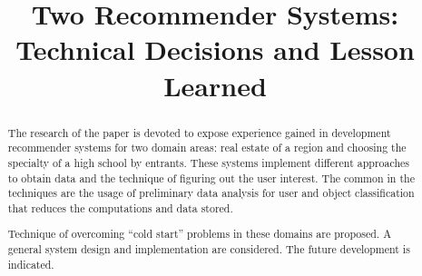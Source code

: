 \documentclass[conference,a4]{IEEEtran}
\begin{document}

\title{Two Recommender Systems: Technical Decisions and Lesson Learned}

\author{%
}

\maketitle
\begin{abstract}
  The research of the paper is devoted to expose experience gained in development recommender systems for two domain areas: real estate of a region and choosing the specialty of a high school by entrants. These systems implement different approaches to obtain data and the technique of figuring out the user interest. The common in the techniques are the usage of preliminary data analysis for user and object classification that reduces the computations and data stored. %

Technique of overcoming ``cold start'' problems in these domains are proposed.  A general system design and implementation are considered.  The future development is indicated.

\end{abstract}
\end{document}
